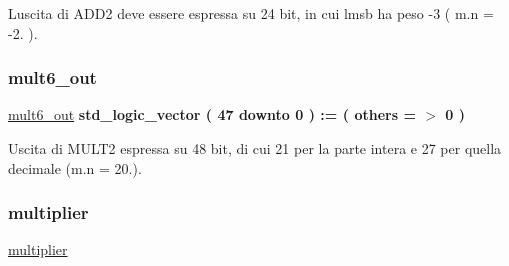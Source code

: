 L\textquotesingle{}uscita di A\+D\+D2 deve essere espressa su 24 bit, in cui l\textquotesingle{}msb ha peso -\/3 ( m.\+n = -\/2. ). \mbox{\label{group___linear_regression_ga207c875b3cd576e5064d6fd3b2a36759}} 
\subsubsection{\texorpdfstring{mult6\+\_\+out}{mult6\_out}}
{\footnotesize\ttfamily \hyperlink{group___linear_regression_ga207c875b3cd576e5064d6fd3b2a36759}{mult6\+\_\+out} {\bfseries \textcolor{vhdlchar}{std\+\_\+logic\+\_\+vector}\textcolor{vhdlchar}{ }\textcolor{vhdlchar}{(}\textcolor{vhdlchar}{ }\textcolor{vhdlchar}{ } \textcolor{vhdldigit}{47} \textcolor{vhdlchar}{ }\textcolor{vhdlchar}{downto}\textcolor{vhdlchar}{ }\textcolor{vhdlchar}{ } \textcolor{vhdldigit}{0} \textcolor{vhdlchar}{ }\textcolor{vhdlchar}{)}\textcolor{vhdlchar}{ }\textcolor{vhdlchar}{ }\textcolor{vhdlchar}{ }\textcolor{vhdlchar}{\+:}\textcolor{vhdlchar}{=}\textcolor{vhdlchar}{ }\textcolor{vhdlchar}{(}\textcolor{vhdlchar}{ }\textcolor{vhdlchar}{ }\textcolor{vhdlchar}{others}\textcolor{vhdlchar}{ }\textcolor{vhdlchar}{ }\textcolor{vhdlchar}{=}\textcolor{vhdlchar}{ }\textcolor{vhdlchar}{$>$}\textcolor{vhdlchar}{ }\textcolor{vhdlchar}{\textquotesingle{}}\textcolor{vhdlchar}{ } \textcolor{vhdldigit}{0} \textcolor{vhdlchar}{ }\textcolor{vhdlchar}{\textquotesingle{}}\textcolor{vhdlchar}{ }\textcolor{vhdlchar}{)}\textcolor{vhdlchar}{ }} \hspace{0.3cm}{\ttfamily [Signal]}}

Uscita di M\+U\+L\+T2 espressa su 48 bit, di cui 21 per la parte intera e 27 per quella decimale (m.\+n = 20.). \mbox{\label{group___linear_regression_ga3cf9cbfc3e637ae0660c32ceef50386f}} 
\subsubsection{\texorpdfstring{multiplier}{multiplier}}
{\footnotesize\ttfamily \hyperlink{group___linear_regression_ga3cf9cbfc3e637ae0660c32ceef50386f}{multiplier} {\bfseries \textcolor{vhdlchar}{ }} \hspace{0.3cm}{\ttfamily [Component]}}

